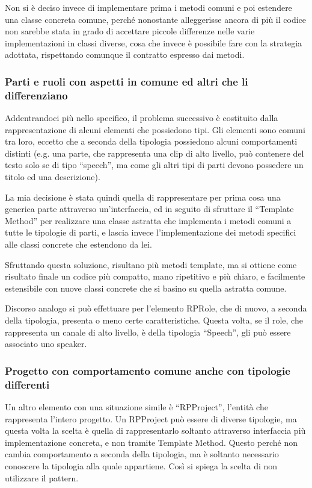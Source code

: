 \documentclass[a4paper,12pt]{report}
\begin{document}
Non si è deciso invece di implementare prima i metodi  comuni e poi estendere una classe concreta comune, perché nonostante alleggerisse ancora di più il codice non sarebbe stata in grado di accettare piccole differenze nelle varie implementazioni in classi diverse, cosa che invece è possibile fare con la strategia adottata, rispettando comunque il contratto espresso dai metodi. 
\endsubsubsection
\subsubsection{Parti e ruoli con aspetti in comune ed altri che li differenziano}
Addentrandoci più nello specifico, il problema successivo è costituito dalla rappresentazione di alcuni elementi che possiedono tipi. Gli elementi sono comuni tra loro, eccetto che a seconda della tipologia possiedono alcuni comportamenti distinti (e.g. una parte, che rappresenta una clip di alto livello, può contenere del testo solo se di tipo “speech”, ma come gli altri tipi di parti devono possedere un titolo ed una descrizione).

La mia decisione è stata quindi quella di rappresentare per prima cosa una generica parte attraverso un’interfaccia, ed in seguito di sfruttare il “Template Method” per realizzare una classe astratta che implementa i metodi comuni a tutte le tipologie di parti, e lascia invece l’implementazione dei metodi specifici alle classi concrete che estendono da lei.

Sfruttando questa soluzione, risultano più metodi template, ma si ottiene come risultato finale un codice più compatto, mano ripetitivo e più chiaro, e facilmente estensibile con nuove classi concrete che si basino su quella astratta comune.

Discorso analogo si può effettuare per l’elemento RPRole, che di nuovo, a seconda della tipologia, presenta o meno certe caratteristiche. Questa volta, se il role, che rappresenta un canale di alto livello, è della tipologia “Speech”, gli può essere associato uno speaker.
\endsubsubsection
\subsubsection{Progetto con comportamento comune anche con tipologie differenti}
Un altro elemento con una situazione simile è “RPProject”, l’entità che rappresenta l’intero progetto. Un RPProject può essere di diverse tipologie, ma questa volta la scelta è quella di rappresentarlo soltanto attraverso interfaccia più implementazione concreta, e non tramite Template Method. Questo perché non cambia comportamento a seconda della tipologia, ma è soltanto necessario conoscere la tipologia alla quale appartiene. Così si spiega la scelta di non utilizzare il pattern.
\endsubsubsection
\end{document}
